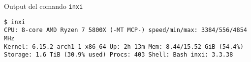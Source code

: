 \begin{listing}[H]
\caption{Output del comando \texttt{inxi}}
\label{lst:inxi_output}
\begin{verbatim}
$ inxi
CPU: 8-core AMD Ryzen 7 5800X (-MT MCP-) speed/min/max: 3384/556/4854 MHz
Kernel: 6.15.2-arch1-1 x86_64 Up: 2h 13m Mem: 8.44/15.52 GiB (54.4%)
Storage: 1.6 TiB (30.9% used) Procs: 403 Shell: Bash inxi: 3.3.38
\end{verbatim}
\end{listing}
